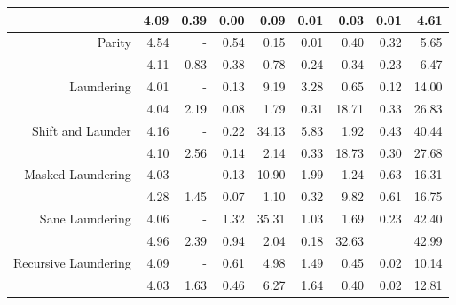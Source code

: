 \begin{figure}
\begin{table}[H]
{\begin{tabular}{r|r|r|r|rr|rr|r}
                                        & 4.09           & 0.39         & 0.00          & 0.09      & 0.01   & 0.03         & 0.01               & 4.61           \\\hline\hline
\multirow{2}{*}{Parity}                 & 4.54           & -            & 0.54         & 0.15       & 0.01   & 0.40         & 0.32               & 5.65           \\
                                        & 4.11           & 0.83         & 0.38         & 0.78       & 0.24   & 0.34         & 0.23               & 6.47           \\\hline
\multirow{2}{*}{Laundering}             & 4.01           & -            & 0.13         & 9.19       & 3.28   & 0.65         & 0.12               & 14.00          \\
                                        & 4.04           & 2.19         & 0.08         & 1.79       & 0.31   & 18.71        & 0.33               & 26.83          \\\hline
\multirow{2}{*}{Shift and Launder}      & 4.16           & -            & 0.22         & 34.13      & 5.83   & 1.92         & 0.43               & 40.44          \\
                                        & 4.10           & 2.56         & 0.14         & 2.14       & 0.33   & 18.73        & 0.30               & 27.68          \\\hline
\multirow{2}{*}{Masked Laundering}      & 4.03           & -            & 0.13         & 10.90      & 1.99   & 1.24         & 0.63               & 16.31          \\
                                        & 4.28           & 1.45         & 0.07         & 1.10       & 0.32   & 9.82         & 0.61               & 16.75          \\\hline
\multirow{2}{*}{Sane Laundering}        & 4.06           & -            & 1.32         & 35.31      & 1.03   & 1.69         & 0.23               & 42.40          \\
                                        & 4.96           & 2.39         & 0.94         & 2.04       & 0.18   & 32.63        &                    & 42.99          \\\hline\hline
\multirow{2}{*}{Recursive Laundering}   & 4.09           & -            & 0.61         & 4.98       & 1.49   & 0.45         & 0.02               & 10.14          \\
                                        & 4.03           & 1.63         & 0.46         & 6.27       & 1.64   & 0.40         & 0.02               & 12.81          \\\hline

\end{tabular}}
\end{table}
\end{figure}
